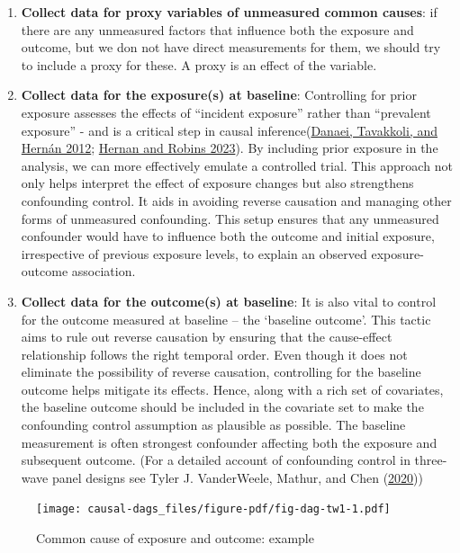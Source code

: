 \documentclass[
  singlecolumn]{report}
\begin{document}
\begin{enumerate}
\def\labelenumi{\arabic{enumi}.}
\setcounter{enumi}{3}
\item
  \textbf{Collect data for proxy variables of unmeasured common causes}:
  if there are any unmeasured factors that influence both the exposure
  and outcome, but we don not have direct measurements for them, we
  should try to include a proxy for these. A proxy is an effect of the
  variable.
\item
  \textbf{Collect data for the exposure(s) at baseline}: Controlling for
  prior exposure assesses the effects of ``incident exposure'' rather
  than ``prevalent exposure'' - and is a critical step in causal
  inference(\protect\hyperlink{ref-danaei2012}{Danaei, Tavakkoli, and
  Hernán 2012}; \protect\hyperlink{ref-hernan2023}{Hernan and Robins
  2023}). By including prior exposure in the analysis, we can more
  effectively emulate a controlled trial. This approach not only helps
  interpret the effect of exposure changes but also strengthens
  confounding control. It aids in avoiding reverse causation and
  managing other forms of unmeasured confounding. This setup ensures
  that any unmeasured confounder would have to influence both the
  outcome and initial exposure, irrespective of previous exposure
  levels, to explain an observed exposure-outcome association.
\item
  \textbf{Collect data for the outcome(s) at baseline}: It is also vital
  to control for the outcome measured at baseline -- the `baseline
  outcome'. This tactic aims to rule out reverse causation by ensuring
  that the cause-effect relationship follows the right temporal order.
  Even though it does not eliminate the possibility of reverse
  causation, controlling for the baseline outcome helps mitigate its
  effects. Hence, along with a rich set of covariates, the baseline
  outcome should be included in the covariate set to make the
  confounding control assumption as plausible as possible. The baseline
  measurement is often strongest confounder affecting both the exposure
  and subsequent outcome. (For a detailed account of confounding control
  in three-wave panel designs see Tyler J. VanderWeele, Mathur, and Chen
  (\protect\hyperlink{ref-vanderweele2020}{2020}))
\end{enumerate}

\begin{figure}

{\centering \texttt{[image: causal-dags\_files/figure-pdf/fig-dag-tw1-1.pdf]}

}

\caption{\label{fig-dag-tw1}Common cause of exposure and outcome:
example}

\end{figure}
\end{document}
